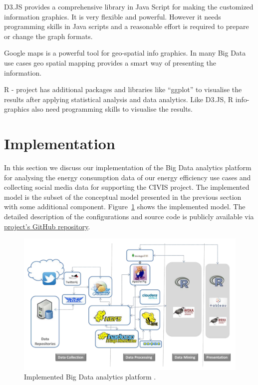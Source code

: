 D3.JS provides a comprehensive library in Java Script for making the customized information graphics. It is very flexible and powerful. However it needs programming skills in Java scripts and a reasonable effort is required to prepare or change the graph formats. 

Google maps is a powerful tool for geo-spatial info graphics. In many Big Data use cases geo spatial mapping provides a smart way of presenting the information.

R - project has additional packages and libraries like ``ggplot'' to visualise the results after applying statistical analysis and data analytics. Like D3.JS, R info-graphics also need programming skills to visualise the results.

\section{Implementation} \label{implemented} 
In this section we discuss our implementation of the Big Data analytics platform for analysing the energy consumption data of our energy efficiency use cases and collecting social media data for supporting the CIVIS project. The implemented model is the subset of the conceptual model presented in the previous section with some additional component. Figure~\ref{fig:iplatform} shows the implemented model. The detailed description of the configurations and source code is publicly available via  \href{https://github.com/hazznain/BigData_for_Energy_Efficiency}{\color{blue}\underline{project's GitHub repository}}.   
\begin{figure}[!ht]
    \begin{center}
      \includegraphics[width=\textwidth]{images/iplatform.pdf}
      \caption{Implemented Big Data analytics platform .}
      \label{fig:iplatform}
    \end{center}
  \end{figure} 
